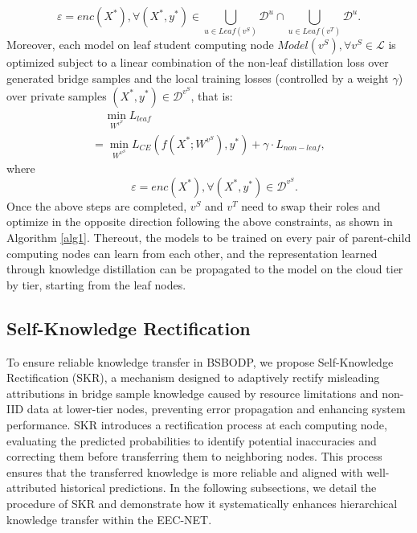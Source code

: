 \documentclass[10pt,journal]{IEEEtran}
\begin{document}
\begin{equation}
    \varepsilon  = enc({X^*}), \forall ({X^*},{y^*}) \in \bigcup\limits_{u \in Leaf({v^S})} {{\mathcal{D}^u}}  \cap \bigcup\limits_{u \in Leaf({v^T})} {{\mathcal{D}^u}}.
    \label{logits-non-leaf}
\end{equation}
Moreover, each model on leaf student computing node $Model(v^{S}),\forall v^{S}\in \mathcal{L}$ is optimized subject to a linear combination of the non-leaf distillation loss over generated bridge samples and the local training losses (controlled by a weight $\gamma$) over private samples $(X^*,y^*)\in \mathcal{D}^{v^{S}}$, that is:
\begin{equation}
		\begin{array}{l}
			 \; \; \; \; \mathop {\min }\limits_{{W^{{v^{S}}}}} {L_{leaf}}\\
			 = \mathop {\min }\limits_{{W^{{v^{S}}}}} {L_{CE}}(f({X^*};{W^{{v^{S}}}}),{y^*}) + \gamma  \cdot {L_{non - leaf}},
		\end{array}
	\label{optim-leaf}
\end{equation}
where
\begin{equation}
	{\quad \varepsilon  = enc({X^*})}, \forall (X^*,y^*)\in \mathcal{D}^{v^{S}}.
    \label{logits-leaf}
\end{equation}
Once the above steps are completed, $v^{S}$ and $v^{T}$ need to swap their roles and optimize in the opposite direction following the above constraints, as shown in Algorithm \ref{alg1}.
Thereout, the models to be trained on every pair of parent-child computing nodes can learn from each other, and the representation learned through knowledge distillation can be propagated to the model on the cloud tier by tier, starting from the leaf nodes.
  



\color{black}
\subsection{Self-Knowledge Rectification}
To ensure reliable knowledge transfer in BSBODP, we propose Self-Knowledge Rectification (SKR), a mechanism designed to adaptively rectify misleading attributions in bridge sample knowledge caused by resource limitations and non-IID data at lower-tier nodes, preventing error propagation and enhancing system performance. SKR introduces a rectification process at each computing node, evaluating the predicted probabilities to identify potential inaccuracies and correcting them before transferring them to neighboring nodes. This process ensures that the transferred knowledge is more reliable and aligned with well-attributed historical predictions. In the following subsections, we detail the procedure of SKR and demonstrate how it systematically enhances hierarchical knowledge transfer within the EEC-NET.
\end{document}
